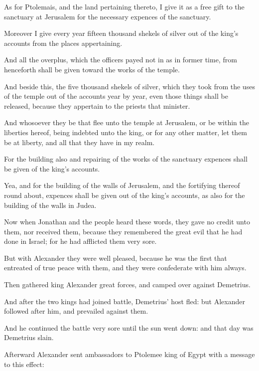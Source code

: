 {\par }{\PP {}As for Ptolemais, and the land pertaining thereto, I give it as a free gift to the sanctuary at Jerusalem for the necessary expences of the sanctuary.
\par }{\PP {}Moreover I give every year fifteen thousand shekels of silver out of the king’s accounts from the places appertaining.
\par }{\PP {}And all the overplus, which the officers payed not in as in former time, from henceforth shall be given toward the works of the temple.
\par }{\PP {}And beside this, the five thousand shekels of silver, which they took from the uses of the temple out of the accounts year by year, even those things shall be released, because they appertain to the priests that minister.
\par }{\PP {}And whosoever they be that flee unto the temple at Jerusalem, or be within the liberties hereof, being indebted unto the king, or for any other matter, let them be at liberty, and all that they have in my realm.
\par }{\PP {}For the building also and repairing of the works of the sanctuary expences shall be given of the king’s accounts.
\par }{\PP {}Yea, and for the building of the walls of Jerusalem, and the fortifying thereof round about, expences shall be given out of the king’s accounts, as also for the building of the walls in Judea.
\par }{\PP {}Now when Jonathan and the people heard these words, they gave no credit unto them, nor received them, because they remembered the great evil that he had done in Israel; for he had afflicted them very sore.
\par }{\PP {}But with Alexander they were well pleased, because he was the first that entreated of true peace with them, and they were confederate with him always.
\par }{\PP {}Then gathered king Alexander great forces, and camped over against Demetrius.
\par }{\PP {}And after the two kings had joined battle, Demetrius’ host fled: but Alexander followed after him, and prevailed against them.
\par }{\PP {}And he continued the battle very sore until the sun went down: and that day was Demetrius slain.
\par }{\PP {}Afterward Alexander sent ambassadors to Ptolemee king of Egypt with a message to this effect:
}
